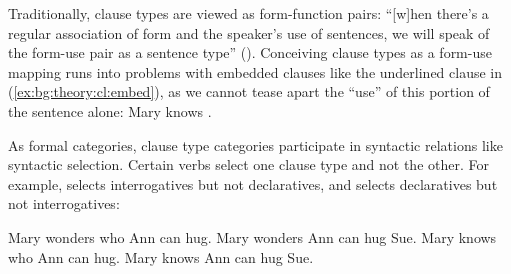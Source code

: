 \begin{comment}
Specifically, declaratives are typically used for assertions (\ref{ex:intro:bg:dec}) and (\ref{ex:intro:man:dec}), interrogatives for questions (\ref{ex:intro:intro:int}) and (\ref{ex:man:intro:int}), and imperatives for commands (\ref{ex:intro:intro:imp}) and (\ref{ex:intro:man:imp}):

\bex{ex:bg:intro}
English clause types:
\bxl \label{ex:bg:intro:dec}
That's Elmo. \hfill Declarative, Assertion
\ex\label{ex:bg:intro:int} Is that Elmo? \hfill Interrogative, Question
\ex\label{ex:bg:intro:imp} Find Elmo! \hfill Imperative, Request
\exl
\eex

\bex{ex:bg:man}
Mandarin clause types:
\bxl \label{ex:bg:man:dec}
\gll Zhe shi Elmo.\\
This is Elmo\\
\trans ``This is Elmo." \hfill Declarative, Assertion
\ex \label{ex:bg:man:int}
\gll Zhe shi Elmo \tbf{ma}?\\
This is Elmo \Sfp\\
\trans ``Is that Elmo?'' \hfill Interrogative
\ex \label{ex:bg:man:imp}
\gll Zhizhi Elmo!\\
Point Elmo\\
\trans ``Point at Elmo!'' \hfill Imperative
\exl
\eex

\end{comment}

Traditionally, clause types are viewed as form-function pairs: ``[w]hen there's a regular association of form and the speaker's use of sentences, we will speak of the form-use pair as a sentence type'' (\cite[156]{sz1985speechact}). Conceiving clause types as a form-use mapping runs into problems with embedded clauses like the underlined clause in (\ref{ex:bg:theory:cl:embed}), as we cannot tease apart the ``use'' of  this portion of the sentence alone:
Mary knows .
\eex

As formal categories, clause type categories participate in syntactic relations like syntactic  selection. Certain verbs select one clause type and not the other. For example,  selects interrogatives but not declaratives, and  selects declaratives but not interrogatives:

\bxl
Mary wonders who Ann can hug.
\ex *Mary wonders Ann can hug Sue.
\exl
\ex \label{ex:intro:embed:know}
\bxl
Mary knows who Ann can hug.
\ex Mary knows Ann can hug Sue.
\exl
\eex

